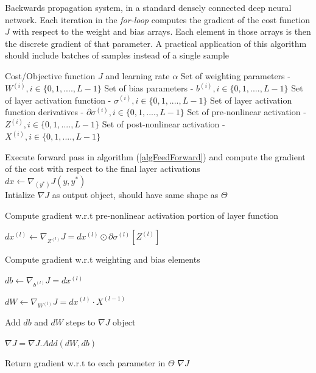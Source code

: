 \documentclass[12pt,letterpaper]{article}
\begin{document}
\begin{algorithm}[H]
\caption{Backwards propagation system, in a standard densely connected deep neural network. Each iteration in the \textit{for-loop} computes the gradient of the cost function $J$ with respect to the weight and bias arrays. Each element in those arrays is then the discrete gradient of that parameter. A practical application of this algorithm should include batches of samples instead of a single sample}
\label{algBackProp}

\begin{algorithmic}
\REQUIRE Cost/Objective function $J$ and learning rate $\alpha$
\REQUIRE Set of weighting parameters - $W^{(i)}, i \in \{0,1,....,L-1\}$
\REQUIRE Set of bias parameters - $b^{(i)}, i \in \{0,1,....,L-1\}$
\REQUIRE Set of layer activation function - $\sigma^{(i)}, i \in \{0,1,....,L-1\}$
\REQUIRE Set of layer activation function derivatives - $\partial\sigma^{(i)}, i \in \{0,1,....,L-1\}$
\REQUIRE Set of pre-nonlinear activation - $Z^{(i)}, i \in \{0,1,....,L-1\}$
\REQUIRE Set of post-nonlinear activation - $X^{(i)}, i \in \{0,1,....,L-1\}$

Execute forward pass in algorithm (\ref{algFeedForward}) and compute the gradient of the cost with respect to the final layer activations \\
$dx \leftarrow \nabla_{(y^*)}J(y,y^*)$ \\
Intialize $\nabla J$ as output object, should have same shape as $\Theta$

	\item Compute gradient w.r.t pre-nonlinear activation portion of layer function
	\item $dx^{(l)} \leftarrow \nabla_{Z^{(l)}}J = dx^{(l)} \odot \partial\sigma^{(l)}[ Z^{(l)} ]$
	\item Compute gradient w.r.t weighting and bias elements
	\item $db \leftarrow \nabla_{b^{(l)}}J = dx^{(l)}$
	\item $dW \leftarrow \nabla_{W^{(l)}}J = dx^{(l)} \cdot X^{(l-1)}$

	\item Add $db$ and $dW$ steps to $\nabla J$ object
	\item $\nabla J = \nabla J .Add(dW,db)$
\ENDFOR

\item Return gradient w.r.t to each parameter in $\Theta$
\RETURN $\nabla J$

\end{algorithmic}
\end{algorithm}
\end{document}
